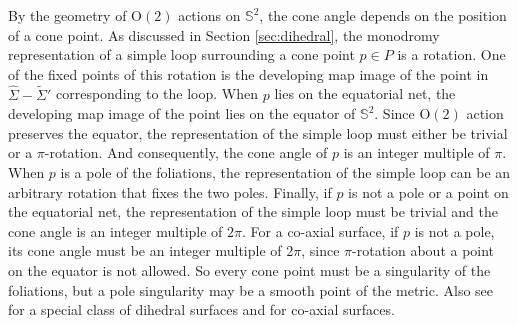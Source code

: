 \documentclass[pdflatex,sn-mathphys]{sn-jnl}%
\numberwithin{equation}{section}
\theoremstyle{thmstyleone}%
\newcommand{\STwo}{\mathbb{S}^2}
\newcommand{\Otwo}{\mathrm{O}(2)}
\begin{document}
\bigskip
By the geometry of $\Otwo$ actions on $\STwo$, the cone angle depends on the position of a cone point. 
As discussed in Section \ref{sec:dihedral}, the monodromy representation of a simple loop surrounding a cone point $p\in P$ is a rotation. One of the fixed points of this rotation is the developing map image of the point in $\hat{\Sigma} - \tilde{\Sigma}'$ corresponding to the loop. 
When $p$ lies on the equatorial net, the developing map image of the point lies on the equator of $\STwo$.
Since $\Otwo$ action preserves the equator, the representation of the simple loop must either be trivial or a $\pi$-rotation. And consequently, the cone angle of $p$ is an integer multiple of $\pi$. %
When $p$ is a pole of the foliations, the representation of the simple loop can be an arbitrary rotation that fixes the two poles. Finally, if $p$ is not a pole or a point on the equatorial net, the representation of the simple loop must be trivial and the cone angle is an integer multiple of $2\pi$. 
For a co-axial surface, if $p$ is not a pole, its cone angle must be an integer multiple of $2\pi$, since $\pi$-rotation about a point on the equator is not allowed. 
So every cone point must be a singularity of the foliations, but a pole singularity may be a smooth point of the metric. 
Also see \cite[Theorem 1.2]{SCLX20} for a special class of dihedral surfaces and \cite[Theorem 1.5]{CWWX15} for co-axial surfaces.
\end{document}
